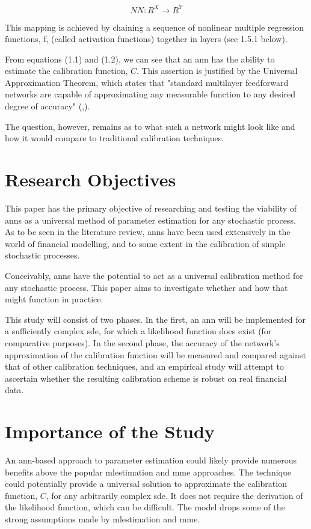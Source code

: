 \documentclass[11pt,oneside,openany,a4paper,english, report, goldenblock
]{usthesis}
\begin{document}
\begin{equation}
NN: R^X \rightarrow R^Y
\end{equation}

This mapping is achieved by chaining a sequence of nonlinear multiple regression functions, f, (called activation functions) together in layers (see 1.5.1 below).


From equations (1.1) and (1.2), we can see that an \acrshort{ann} has the ability to estimate the calibration function, $ C $. 
This assertion is justified by the Universal Approximation Theorem, which states that "standard multilayer feedforward networks are capable of approximating any measurable function to any desired degree of accuracy" (,\citeyear{Hornik}).


The question, however, remains as to what such a network might look like and how it would compare to traditional calibration techniques.

\section{Research Objectives}
This paper has the primary objective of researching and testing the viability of \acrshort{ann}s as a universal method of parameter estimation for any stochastic process. As to be seen in the literature review, \acrshort{ann}s have been used extensively in the world of financial modelling, and to some extent in the calibration of simple stochastic processes.


Conceivably, \acrshort{ann}s have the potential to act as a universal calibration method for any stochastic process. This paper aims to investigate whether and how that might function in practice.


This study will consist of two phases. In the first, an \acrshort{ann} will be implemented for a sufficiently complex \acrshort{sde}, for which a likelihood function does exist (for comparative purposes). In the second phase, the accuracy of the network's approximation of the calibration function will be measured and compared against that of other calibration techniques, and an empirical study will attempt to ascertain whether the resulting calibration scheme is robust on real financial data.

\section{Importance of the Study}

An \acrshort{ann}-based approach to parameter estimation could likely provide numerous benefits above the popular \acrshort{mlestimation} and \acrshort{mme} approaches.
The technique could potentially provide a universal solution to approximate the calibration function, $C$, for any arbitrarily complex \acrshort{sde}.
It does not require the derivation of the likelihood function, which can be difficult.
The model drops some of the strong assumptions made by \acrshort{mlestimation} and \acrshort{mme}. 
\end{document}
